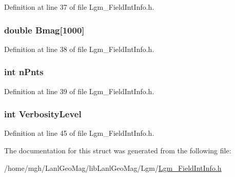 Definition at line 37 of file Lgm\_\-FieldIntInfo.h.\hypertarget{struct_lgm___field_int_info_6abcff3fdb33e77737583c51c10132e2}{
\subsubsection[{Bmag}]{\setlength{\rightskip}{0pt plus 5cm}double {\bf Bmag}\mbox{[}1000\mbox{]}}}
\label{struct_lgm___field_int_info_6abcff3fdb33e77737583c51c10132e2}




Definition at line 38 of file Lgm\_\-FieldIntInfo.h.\hypertarget{struct_lgm___field_int_info_e64e724dd0713b2ba2fca5aedab3fd34}{
\subsubsection[{nPnts}]{\setlength{\rightskip}{0pt plus 5cm}int {\bf nPnts}}}
\label{struct_lgm___field_int_info_e64e724dd0713b2ba2fca5aedab3fd34}




Definition at line 39 of file Lgm\_\-FieldIntInfo.h.\hypertarget{struct_lgm___field_int_info_ef3011234df74566b679b46e01273bb7}{
\subsubsection[{VerbosityLevel}]{\setlength{\rightskip}{0pt plus 5cm}int {\bf VerbosityLevel}}}
\label{struct_lgm___field_int_info_ef3011234df74566b679b46e01273bb7}




Definition at line 45 of file Lgm\_\-FieldIntInfo.h.

The documentation for this struct was generated from the following file:\begin{CompactItemize}
\item 
/home/mgh/LanlGeoMag/libLanlGeoMag/Lgm/\hyperlink{_lgm___field_int_info_8h}{Lgm\_\-FieldIntInfo.h}\end{CompactItemize}
